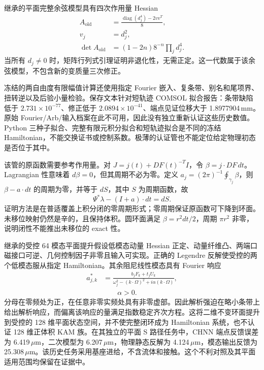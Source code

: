 继承的平面完整余弦模型具有四次作用量 Hessian
\begin{equation}
 \begin{aligned}
 A_{\mathrm{old}}&=\frac{\operatorname{diag}(d_j^4)-2vv^T}{8},\\
 v_j&=d_j^2,\\
 \det A_{\mathrm{old}}&=(1-2n)8^{-n}\prod_jd_j^4.
 \end{aligned}
 \label{eq:supp-learn-old-twist}
\end{equation}
当所有 $d_j\ne0$ 时，矩阵行列式引理证明非退化性，无需正定。这一代数属于该余弦模型，不包含新的变质量三次修正。

冻结的两自由度有限幅值计算还使用指定 Fourier 嵌入、复条带、别名和尾项界、扭转逆以及后验小量检验。保存文本针对短轨迹 COMSOL 拟合报告：条带缺陷低于 $2.731\times10^{-77}$、修正低于 $2.0894\times10^{-41}$、端点见证位移大于 1.8977904\,mm。原始 Fourier/Arb/输入档案在此不可用，因此没有独立重新认证这些历史数值。Python 三种子拟合、完整有限元积分拟合和短轨迹拟合是不同的冻结 Hamiltonian，不能交换证书或控制系数。极薄的认证管也不能定位给定物理初态是否位于其中。

该管的原函数需要参考作用量。对 $J=j(t)+DF(t)^{-T}I$，令 $\beta=j\cdot DF\,dt$。Lagrangian 性意味着 $d\beta=0$，但其周期不必为零。定义 $a_j=(2\pi)^{-1}\oint_{\gamma_j}\beta$，则 $\beta-a\cdot dt$ 的周期为零，并等于 $dS$，其中 $S$ 为周期函数，故
\begin{equation}
 \Psi^*\lambda-(I+a)\cdot dt=dS.
 \label{eq:supp-learn-reference-action}
\end{equation}
证明方法是在普适覆盖上积分闭的零周期形式；零周期保证原函数可下降到环面。未移位映射仍然是辛的，且保持体积。圆环面满足 $\beta=r^2dt/2$，周期 $\pi r^2$ 非零，说明闭性不能推出未移位的 exact 性。

继承的受控 64 模态平面提升假设低模态动量 Hessian 正定、动量纤维凸、两端口磁接口可逆、几何控制因子非零且输入可实现。正确的 Legendre 反解使受控的两个低模态服从指定 Hamiltonian。其余阻尼线性模态具有 Fourier 响应
\begin{equation}
 \begin{aligned}
 a^*_{j,k}&=\frac{b_jF_k+t_jU_k}{\omega_j^2-(k\cdot\Omega)^2+i\alpha(k\cdot\Omega)},\\
 &\qquad\alpha>0.
 \end{aligned}
 \label{eq:supp-learn-planar-lift}
\end{equation}
分母在零频处为正，在任意非零实频处具有非零虚部。因此解析强迫在略小条带上给出解析响应，而偏离该响应的量满足指数稳定齐次方程。这将二维不变环面提升到受控的 128 维平面状态空间，并不使完整闭环成为 Hamiltonian 系统，也不认证 128 维正体积 KAM 族。在其独立的平面 S 路径任务中，CHNN 端点反馈误差为 6.419\,$\mu$m，二次模型为 6.207\,$\mu$m，物理静态反解为 4.124\,$\mu$m，模态输出反馈为 25.308\,$\mu$m。该历史任务采用基座进给，不含流体和接触。这个不利对照及其平面适用范围均保留在证据中。
